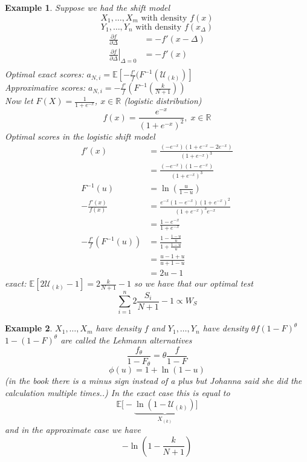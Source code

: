 \documentclass[a4paper,12pt]{amsart}
\newcommand{\sumin}{\sum_{i=1}^n}
\newcommand{\E}[1]{\mathbb{E}\left[#1\right]}
\newtheorem{ex}{Example}
\begin{document}
\begin{ex}
Suppose we had the shift model
\[X_1,\ldots, X_m \text{ with density } f(x)\]
\[Y_1, \ldots, Y_n \text{ with density } f(x_\Delta)\]
\begin{align*}
\frac{\partial f}{\partial \Delta} &= - f'(x-\Delta)\\
\left.\frac{\partial f}{\partial \Delta}\right|_{\Delta=0} &= - f'(x)\\
\end{align*}
Optimal exact scores: $a_{N,i} = \E{-\frac{f'}{f}(F^{-1}(\mathcal{U}_{(k)})}$\\
Approximative scores: $a_{N,i} = -\frac{f'}{f}(F^{-1}\left(\frac{k}{N+1}\right))$\\
Now let $F(X) = \frac{1}{1+e^{-x}}$, $x \in \mathbb{R}$ (logistic distribution)
\[f(x) = \frac{e^{-x}}{(1+e^{-x})^2}, \; x \in \mathbb{R}\]
Optimal scores in the logistic shift model 
\begin{align*}
f'(x) &= \frac{(-e^{-x})(1 + e^{-x} - 2 e^{-x})}{(1 + e^{-x})^3}\\
&= \frac{(-e^{-x})(1-e^{-x})}{(1+e^{-x})^3}\\
F^{-1}(u) &= \ln \left(\frac{u}{1-u}\right)\\
-\frac{f'(x)}{f(x)} &= \frac{e^{-x}(1-e^{-x})(1+e^{-x})^2}{(1+e^{-x})^3e^{-x}}\\
&= \frac{1-e^{-x}}{1+e^{-x}}\\
-\frac{f'}{f}(F^{-1}(u)) &= \frac{1 - \frac{1-u}{u}}{1 + \frac{1-u}{u}}\\
&= \frac{u-1 + u}{u+1 - u}\\
&= 2u-1
\end{align*}
exact: $\E{2 \mathcal{U}_{(k)}-1} = 2 \frac{k}{N+1}-1$
so we have that our optimal test
\[\sumin 2 \frac{S_i}{N+1} -1 \varpropto W_S\]
\end{ex}

\begin{ex}
$X_1, \ldots, X_m$ have density $f$ and $Y_1, \ldots, Y_n$ have density $\theta f(1-F)^\theta$\\
$1 - (1-F)^\theta$ are called the Lehmann alternatives
\[\frac{f_\theta}{1 - F_\theta} = \theta \frac{f}{1-F}\]
\[\phi(u) = 1 + \ln (1-u)\]
(in the book there is a minus sign instead of a plus but Johanna said she did the calculation multiple times..) In the exact case this is equal to
\[\mathbb{E}\big[- \underbrace{\ln (1-\mathcal{U}_{(k)})}_{X_{(k)}}\big]\]
and in the approximate case we have
\[- \ln\left(1 - \frac{k}{N+1}\right)\]
\end{ex}
\end{document}
